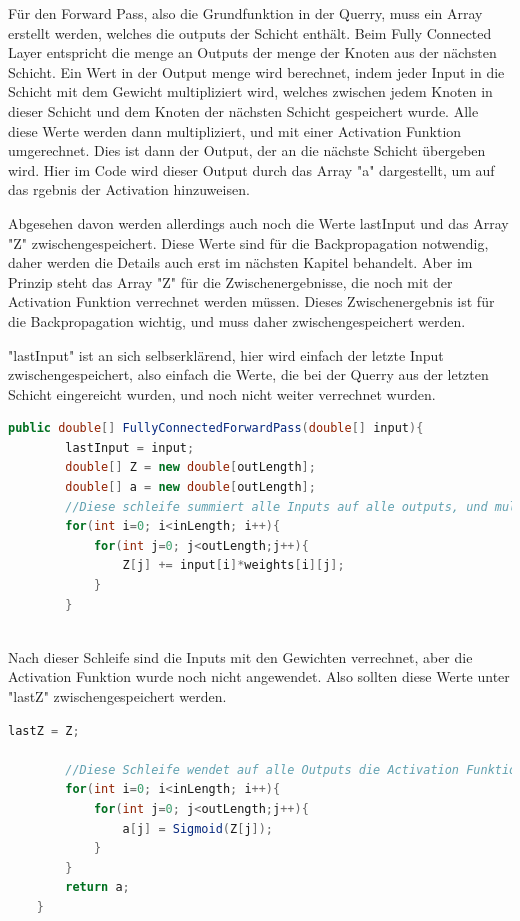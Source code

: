 \documentclass[12pt]{article}
\begin{document}
Für den Forward Pass, also die Grundfunktion in der Querry, muss ein Array erstellt werden, welches die outputs der Schicht enthält. Beim Fully Connected Layer entspricht die menge an Outputs der menge der Knoten aus der nächsten Schicht. Ein Wert in der Output menge wird berechnet, indem jeder Input in die Schicht mit dem Gewicht multipliziert wird, welches zwischen jedem Knoten in dieser Schicht und dem Knoten der nächsten Schicht gespeichert wurde. Alle diese Werte werden dann multipliziert, und mit einer Activation Funktion umgerechnet. Dies ist dann der Output, der an die nächste Schicht übergeben wird. Hier im Code wird dieser Output durch das Array "a" dargestellt, um auf das rgebnis der Activation hinzuweisen.

Abgesehen davon werden allerdings auch noch die Werte lastInput und das Array "Z" zwischengespeichert. Diese Werte sind für die Backpropagation notwendig, daher werden die Details auch erst im nächsten Kapitel behandelt. Aber im Prinzip steht das Array "Z" für die Zwischenergebnisse, die noch mit der Activation Funktion verrechnet werden müssen. Dieses Zwischenergebnis ist für die Backpropagation wichtig, und muss daher zwischengespeichert werden.

"lastInput" ist an sich selbserklärend, hier wird einfach der letzte Input zwischengespeichert, also einfach die Werte, die bei der Querry aus der letzten Schicht eingereicht wurden, und noch nicht weiter verrechnet wurden.

\begin{lstlisting}[language=Java]
    public double[] FullyConnectedForwardPass(double[] input){
        lastInput = input;
        double[] Z = new double[outLength];
        double[] a = new double[outLength];
        //Diese schleife summiert alle Inputs auf alle outputs, und multipliziert die Inputs mit ihren jeweiligen gewichten aus der weights-Matrix
        for(int i=0; i<inLength; i++){
            for(int j=0; j<outLength;j++){
                Z[j] += input[i]*weights[i][j];
            }
        }
        
\end{lstlisting}
Nach dieser Schleife sind die Inputs mit den Gewichten verrechnet, aber die Activation Funktion wurde noch nicht angewendet. Also sollten diese Werte unter "lastZ" zwischengespeichert werden.
\begin{lstlisting}[language=Java] 
        lastZ = Z;
		
		//Diese Schleife wendet auf alle Outputs die Activation Funktion an, in diesem Falle die Sigmoid Funktion
        for(int i=0; i<inLength; i++){
            for(int j=0; j<outLength;j++){
                a[j] = Sigmoid(Z[j]);
            }
        }
        return a;
    }
\end{lstlisting} 
\end{document}
